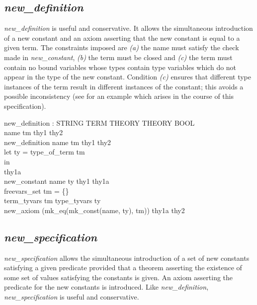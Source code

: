 \documentclass[a4paper,11pt,titlepage]{article}
\begin{document}
\begin{titlepage}
\subsection{{\it new\_definition}}
{\it new\_definition} is useful and conservative.
It allows the simultaneous introduction of a new constant
and an axiom asserting that the new constant is equal
to a given term.
The constraints imposed are {\it (a)} the name must satisfy the
check made in {\it new\_constant}, {\it (b)} the term
must be closed and {\it (c)} the term must contain
no bound variables whose types contain type variables
which do not appear in the type of the new constant.
Condition {\it (c)} ensures that different type instances
of the term result in different instances of the
constant; this avoids a possible inconsistency (see \cite{DS/FMU/IED/SPC004} for an example which arises in the course
of this specification).
\begin{HOLConst}
\+	\PrNL{}new\_definition\PrNN{} : STRING \MMM{\rightarrow} TERM \MMM{\rightarrow} THEORY \MMM{\rightarrow} THEORY \MMM{\rightarrow} BOOL\\
\PrPH{}
\+	\MMM{\forall} name tm thy1 thy2 \MMM{\bullet}\\
\+	new\_definition name tm thy1 thy2 \MMM{\Leftrightarrow}\\
\+	let ty = type\_of\_term tm\\
\+	in\\
\+	\MMM{\exists} thy1a \MMM{\bullet}\\
\+	new\_constant name ty thy1 thy1a \MMM{\land}\\
\+	freevars\_set tm = \{\} \MMM{\land}\\
\+	term\_tyvars tm \MMM{\subseteq} type\_tyvars ty \MMM{\land}\\
\+	new\_axiom (mk\_eq(mk\_const(name, ty), tm)) thy1a thy2\\
\end{HOLConst}


\subsection{{\it new\_specification}}

{\it new\_specification} allows the simultaneous
introduction of a set of new constants satisfying a
given predicate provided that a theorem asserting
the existence of some set of values satisfying the
constants is given. An axiom asserting the predicate
for the new constants is introduced.
Like {\it new\_definition}, {\it new\_specification}
is useful and conservative.


\end{titlepage}
\end{document}
